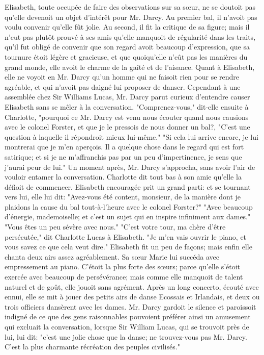 Elisabeth, toute occupée de faire des observations sur sa sœur, ne se doutoit pas qu’elle devenoit un objet d’intérêt pour Mr. Darcy. Au premier bal, il n’avoit pas voulu convenir qu’elle fût jolie. Au second, il fit la critique de sa figure; mais il n’eut pas plutôt prouvé à ses amis qu’elle manquoit de régularité dans les traits, qu’il fut obligé de convenir que son regard avoit beaucoup d’expression, que sa tournure étoit légère et gracieuse, et que quoiqu’elle n’eût pas les manières du grand monde, elle avoit le charme de la gaîté et de l’aisance. Quant à Elisabeth, elle ne voyoit en Mr. Darcy qu’un homme qui ne faisoit rien pour se rendre agréable, et qui n’avoit pas daigné lui proposer de danser. Cependant à une assemblée chez Sir Williams Lucas, Mr. Darcy parut curieux d’entendre causer Elisabeth sans se mêler à la conversation.
"Comprenez-vous," dit-elle ensuite à Charlotte, "pourquoi ce Mr. Darcy est venu nous écouter quand nous causions avec le colonel Forster, et que je le pressois de nous donner un bal?,
"C’est une question à laquelle il répondroit mieux lui-même."
\setcounter{page}{384}
"Si cela lui arrive encore, je lui montrerai que je m'en aperçois. Il a quelque chose dans le regard qui est fort satirique; et si je ne m'affranchis pas par un peu d'impertinence, je sens que j'aurai peur de lui."
Un moment après, Mr. Darcy s'approcha, sans avoir l'air de vouloir entamer la conversation. Charlotte dit tout bas à son amie qu'elle la défioit de commencer. Elisabeth encouragée prit un grand parti: et se tournant vers lui, elle lui dit: "Avez-vous été content, monsieur, de la manière dont je plaidons la cause du bal tout-à-l'heure avec le colonel Forster?"
"Avec beaucoup d'énergie, mademoiselle; et c'est un sujet qui en inspire infiniment aux dames."
"Vous êtes un peu sévère avec nous."
"C'est votre tour, ma chère d'être persécutée," dit Charlotte Lucas à Elisabeth.
"Je m'en vais ouvrir le piano, et vous savez ce que cela veut dire."
Elisabeth fit un peu de façons; mais enfin elle chanta deux airs assez agréablement. Sa sœur Marie lui succéda avec empressement au piano. C'étoit la plus forte des sœurs; parce qu'elle s'étoit exercée avec beaucoup de persévérance; mais comme elle manquoit\setcounter{page}{385} de talent naturel et de goût, elle jouoit sans agrément. Après un long concerto, écouté avec ennui, elle se mit à jouer des petits airs de danse Ecossais et Irlandais, et deux ou trois officiers dansèrent avec les dames.
Mr. Darcy gardoit le silence et paroissoit indigné de ce que des gens raisonnables pouvoient préférer ainsi un amusement qui excluait la conversation, lorsque Sir William Lucas, qui se trouvoit près de lui, lui dit: "c'est une jolie chose que la danse; ne trouvez-vous pas Mr. Darcy. C'est la plus charmante récréation des peuples civilisés."
